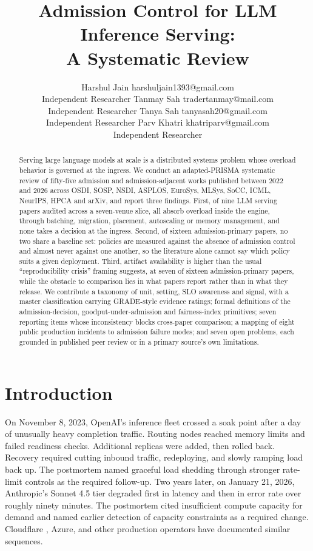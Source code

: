 \documentclass[10pt]{article} %
\title{Admission Control for LLM Inference Serving:\\ A Systematic Review}
\author{\name Harshul Jain \email harshuljain1393@gmail.com \\
      \addr Independent Researcher
      \AND
      \name Tanmay Sah \email tradertanmay@mail.com \\
      \addr Independent Researcher
      \AND
      \name Tanya Sah \email tanyasah20@gmail.com \\
      \addr Independent Researcher
      \AND
      \name Parv Khatri \email khatriparv@gmail.com \\
      \addr Independent Researcher}
\theoremstyle{definition}
\begin{document}
\maketitle

\begin{abstract}
\noindent
Serving large language models at scale is a distributed systems problem
whose overload behavior is governed at the ingress. We conduct an
adapted-PRISMA systematic review of fifty-five admission and
admission-adjacent works published between 2022 and 2026 across OSDI,
SOSP, NSDI, ASPLOS, EuroSys, MLSys, SoCC, ICML, NeurIPS, HPCA and
arXiv, and report three findings. First, of nine LLM serving papers
audited across a seven-venue slice, all absorb overload inside the
engine, through batching, migration, placement, autoscaling or memory
management, and none takes a decision at the ingress.
Second, of sixteen admission-primary papers, no two share a baseline
set: policies are measured against the absence of admission control
and almost never against one another, so the literature alone cannot
say which policy suits a given deployment. Third, artifact
availability is higher than the usual ``reproducibility crisis''
framing suggests, at seven of sixteen admission-primary papers, while
the obstacle to comparison lies in what papers report rather than in
what they release. We contribute a taxonomy of unit, setting,
SLO awareness and signal, with a master classification carrying
GRADE-style evidence ratings; formal definitions of the
admission-decision, goodput-under-admission and fairness-index
primitives; seven reporting items whose inconsistency blocks
cross-paper comparison; a mapping of eight public production incidents
to admission failure modes; and seven open problems, each grounded in
published peer review or in a primary source's own limitations.
\end{abstract}

\section{Introduction}

On November 8, 2023, OpenAI's inference fleet crossed a soak point after
a day of unusually heavy completion traffic. Routing nodes reached
memory limits and failed readiness checks. Additional replicas were
added, then rolled back. Recovery required cutting inbound traffic,
redeploying, and slowly ramping load back up. The postmortem named
graceful load shedding through stronger rate-limit controls as the
required follow-up. Two years later, on January 21, 2026, Anthropic's
Sonnet 4.5 tier degraded first in latency and then in error rate over
roughly ninety minutes. The postmortem cited insufficient compute
capacity for demand and named earlier detection of capacity constraints
as a required change. Cloudflare \citep{cloudflare_ratelimit_2017,cloudflare_ratelimit_2022}, Azure, and other production operators
have documented similar sequences.
\end{document}
